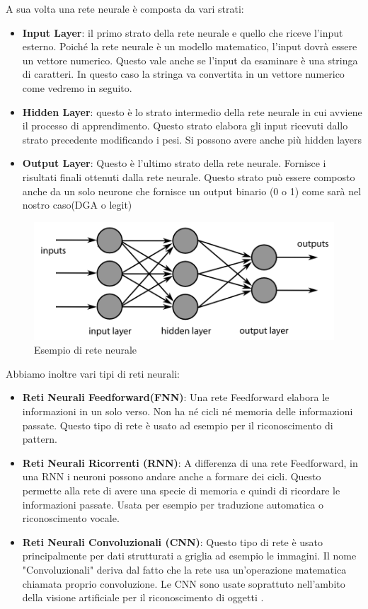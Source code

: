 \documentclass[12pt,a4paper,openright,twoside]{book}
\begin{document}
A sua volta una rete neurale è composta da vari strati:
\begin{itemize}
    \item \textbf{Input Layer}: il primo strato della rete neurale
    e quello che riceve l'input esterno. Poiché la rete neurale
    è un modello matematico, l'input dovrà essere
    un vettore numerico. Questo vale anche se l'input da esaminare
    è una stringa di caratteri. In questo caso la stringa va convertita in un vettore numerico
    come vedremo in seguito.
    \item \textbf{Hidden Layer}: questo è lo strato intermedio della rete neurale in cui avviene
    il processo di apprendimento.
    Questo strato elabora gli input ricevuti dallo strato precedente
    modificando i pesi. Si possono avere anche più hidden layers
    \item \textbf{Output Layer}: Questo è l'ultimo strato della rete neurale.
    Fornisce i risultati finali ottenuti dalla rete neurale. Questo strato
    può essere composto anche da un solo neurone che fornisce
    un output binario (0 o 1) come sarà nel nostro caso(DGA o legit)
\end{itemize}

\begin{figure}[H]
    \centering
    \includegraphics[width=.8\linewidth]{figures/MultiLayerNeuralNetwork.png}
    \caption{Esempio di rete neurale \cite{wiki:001}}
    \label{fig:ANN}
\end{figure}

Abbiamo inoltre vari tipi di reti neurali:
\begin{itemize}
    \item \textbf{Reti Neurali Feedforward(FNN)}: Una rete Feedforward
    elabora le informazioni in un solo verso. Non ha né cicli
    né memoria delle informazioni passate. Questo tipo di rete
    è usato ad esempio per il riconoscimento di pattern.
    \item \textbf{Reti Neurali Ricorrenti (RNN)}:
    A differenza di una rete Feedforward, in una RNN 
    i neuroni possono andare anche a formare dei cicli. 
    Questo permette alla rete di avere una specie di memoria
    e quindi di ricordare le informazioni passate. Usata
    per esempio per traduzione automatica o riconoscimento vocale.
    \item \textbf{Reti Neurali Convoluzionali (CNN)}: Questo tipo di rete
    è usato principalmente per dati strutturati a griglia ad esempio le immagini.
    Il nome "Convoluzionali" deriva dal fatto che la
    rete usa un'operazione matematica chiamata proprio
    convoluzione. Le CNN sono usate soprattuto nell'ambito della
    visione artificiale per il riconoscimento di oggetti
    \cite{Goodfellow-et-al-2016}.
\end{itemize}
\end{document}
